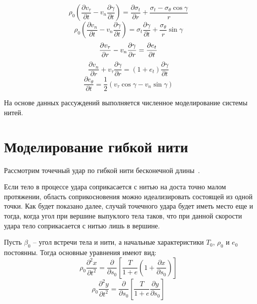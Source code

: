 \begin{equation}
    \rho_0 \left( \dfrac{\partial v_{\tau}}{\partial t} - v_n \dfrac{\partial \gamma}{\partial t} \right) = \dfrac{\partial \sigma_t}{\partial r} + \dfrac{\sigma_t - \sigma_{\theta} \cos{\gamma}}{r}
\end{equation}
\begin{equation}
    \rho_0 \left( \dfrac{\partial v_n}{\partial t} - v_n \dfrac{\partial \gamma}{\partial t} \right) = \sigma_t \dfrac{\partial \gamma}{\partial t} + \dfrac{\sigma_{\theta}}{r} \sin{\gamma}
\end{equation}
\begin{equation}
    \dfrac{\partial v_{\tau}}{\partial r} - v_n \dfrac{\partial \gamma}{\partial r} = \dfrac{\partial e_t}{\partial t} \\
\end{equation}
\begin{equation}
    \dfrac{\partial v_n}{\partial r} + v_{\tau} \dfrac{\partial \gamma}{\partial r} = \left( 1 + e_t \right) \dfrac{\partial \gamma}{\partial t}
\end{equation}
\begin{equation}
    \dfrac{\partial e_{\theta}}{\partial t} = \dfrac{1}{2} \left( v_{\tau} \cos{\gamma} - v_n \sin{\gamma} \right)
\end{equation}


На основе данных рассуждений выполняется численное моделирование системы нитей.

\section{Моделирование гибкой нити}\label{sec:eq-fibers}
Рассмотрим точечный удар по гибкой нити бесконечной длины~\cite{rakhmatulin}.

Если тело в процессе удара соприкасается с нитью на доста точно малом протяжении, область соприкосновения можно
идеализировать состоящей из одной точки.
Как будет показано далее, случай точечного удара будет иметь место еще и тогда, когда угол при вершине выпуклого
тела таков, что при данной скорости удара тело соприкасается с нитью лишь в вершине.

Пусть $\beta_0$ -- угол встречи тела и нити, а начальные характеристики $T_0$, $\rho_0$ и $e_0$ постоянны.
Тогда основные уравнения имеют вид:
\begin{equation}
    \rho_0 \dfrac{\partial^2 x}{\partial t^2} = \dfrac{\partial}{\partial s_0} \left[ \dfrac{T}{1 + e} \left( 1 + \dfrac{\partial x}{\partial s_0} \right) \right]
\end{equation}
\begin{equation}
    \rho_0 \dfrac{\partial^2 y}{\partial t^2} = \dfrac{\partial}{\partial s_0} \left[ \dfrac{T}{1 + e} \dfrac{\partial y}{\partial s_0} \right]
\end{equation}

